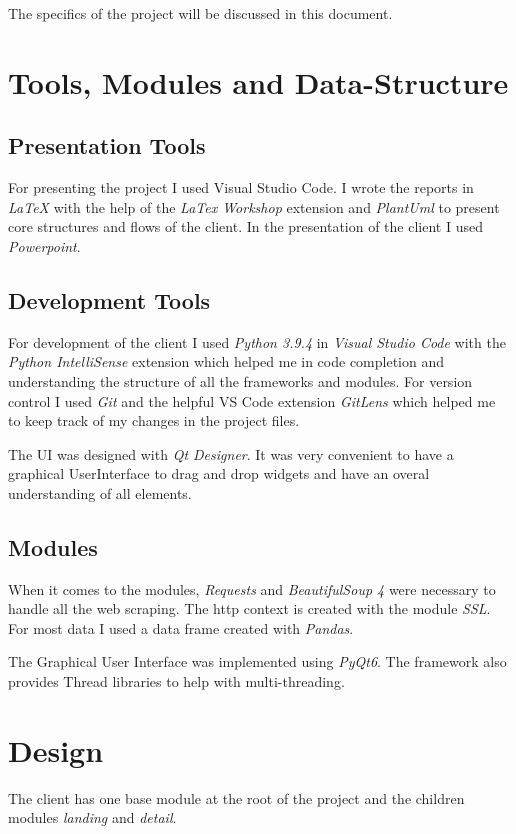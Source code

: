 \documentclass[12pt]{article}
\begin{document}
The specifics of the project will be discussed in this document.

\section{Tools, Modules and Data-Structure}
\subsection{Presentation Tools}
For presenting the project I used Visual Studio Code. I wrote the reports in \textit{\LaTeX} with the help of the \textit{LaTex Workshop} extension and 
\textit{PlantUml} to present core structures and flows of the client.
In the presentation of the client I used \textit{Powerpoint}. 

\subsection{Development Tools}
For development of the client I used \textit{Python 3.9.4} in \textit{Visual Studio 
Code} with the \textit{Python IntelliSense} extension which helped me in code 
completion and understanding the structure of all the frameworks and modules. For 
version control I used \textit{Git} and the helpful VS Code extension 
\textit{GitLens} which helped me to keep track of my changes in the project files.

The UI was designed with \textit{Qt Designer}. It was very convenient to
have a graphical UserInterface to drag and drop widgets and have an overal 
understanding of all elements.

\subsection{Modules}
When it comes to the modules, \textit{Requests} and \textit{BeautifulSoup 4} were  
necessary to handle all the web scraping. The http context is created with the 
module \textit{SSL}. For most data I used a data frame created with \textit{Pandas}.

The Graphical User Interface was implemented using \textit{PyQt6}. The framework also
provides Thread libraries to help with multi-threading.

\section{Design}
The client has one base module at the root of the project and the children modules 
\textit{landing} and \textit{detail}.
\end{document}
